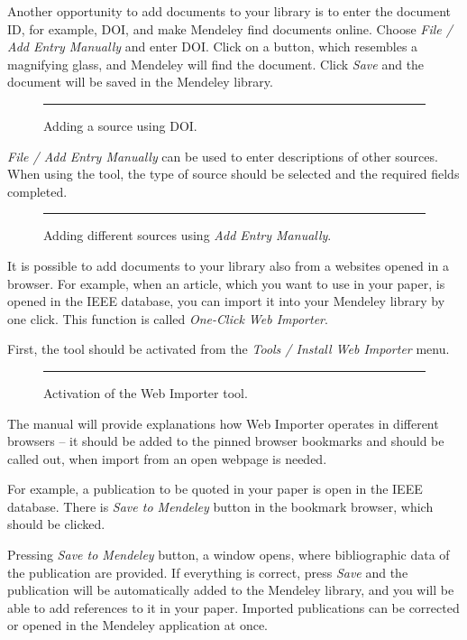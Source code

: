 Another opportunity to add documents to your library is to enter the document ID, for example, DOI, and make Mendeley find documents online. Choose \emph{File / Add Entry Manually} and enter DOI. Click on a button, which resembles a magnifying glass, and Mendeley will find the document. Click \emph{Save} and the document will be saved in the Mendeley library.

\begin{figure}[ht]
  \centering
  \rule{0.8\linewidth}{0.35\linewidth}
  \caption{Adding a source using DOI.}
  \label{fig:mend-add-doi}
\end{figure}

\emph{File / Add Entry Manually} can be used to enter descriptions of other sources. When using the tool, the type of source should be selected and the required fields completed.

\begin{figure}[ht]
  \centering
  \rule{0.8\linewidth}{0.35\linewidth}
  \caption{Adding different sources using \emph{Add Entry Manually}.}
  \label{fig:mend-add-manual}
\end{figure}

It is possible to add documents to your library also from a websites opened in a browser. For example, when an article, which you want to use in your paper, is opened in the IEEE database, you can import it into your Mendeley library by one click. This function is called \emph{One-Click Web Importer}.

First, the tool should be activated from the \emph{Tools / Install Web Importer} menu.

\begin{figure}[ht]
  \centering
  \rule{0.8\linewidth}{0.35\linewidth}
  \caption{Activation of the Web Importer tool.}
  \label{fig:mend-web-importer}
\end{figure}

The manual will provide explanations how Web Importer operates in different browsers – it should be added to the pinned browser bookmarks and should be called out, when import from an open webpage is needed.

For example, a publication to be quoted in your paper is open in the IEEE database. There is \emph{Save to Mendeley} button in the bookmark browser, which should be clicked.

Pressing \emph{Save to Mendeley} button, a window opens, where bibliographic data of the publication are provided. If everything is correct, press \emph{Save} and the publication will be automatically added to the Mendeley library, and you will be able to add references to it in your paper. Imported publications can be corrected or opened in the Mendeley application at once.


